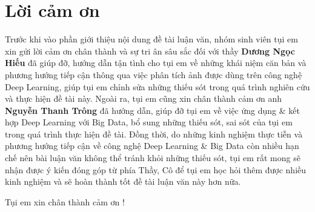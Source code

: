 \documentclass[12pt]{report}
\begin{document}
%
\tableofcontents

%

%
\listoffigures
\listoftables
\chapter*{Lời cảm ơn}
Trước khi vào phần giới thiệu nội dung đề tài luận văn, nhóm sinh viên tụi em xin gửi lời cảm ơn chân thành và sự tri ân sâu sắc đối với thầy \textbf{Dương Ngọc Hiếu} đã giúp đỡ, hướng dẫn tận tình cho tụi em về những khái niệm căn bản và phương hướng tiếp cận thông qua việc phân tích ảnh được dùng trên công nghệ Deep Learning, giúp tụi em chỉnh sửa những thiếu sót trong quá trình nghiên cứu và thực hiện đề tài này. Ngoài ra, tụi em cũng xin chân thành cảm ơn anh \textbf{Nguyễn Thanh Trông} đã hướng dẫn, giúp đỡ tụi em về việc ứng dụng \& kết hợp Deep Learning với Big Data, bổ sung những thiếu sót, sai sót của tụi em trong quá trình thực hiện đề tài. Đồng thời, do những kinh nghiệm thực tiễn và phương hướng tiếp cận về công nghệ Deep Learning \& Big Data còn nhiều hạn chế nên bài luận văn không thể tránh khỏi những thiếu sót, tụi em rất mong sẽ nhận được ý kiến đóng góp từ phía Thầy, Cô để tụi em học hỏi thêm được nhiều kinh nghiệm và sẽ hoàn thành tốt đề tài luận văn này hơn nữa.
\begin{flushright}
Tụi em xin chân thành cảm ơn ! 
\end{flushright}
%
\newpage\cleardoublepage
\newpage\cleardoublepage
\newpage\cleardoublepage
\newpage\cleardoublepage
\newpage\cleardoublepage
\newpage\cleardoublepage
\newpage\cleardoublepage
\newpage\cleardoublepage
\nocite{*}
%
\newpage\cleardoublepage

\end{document}
